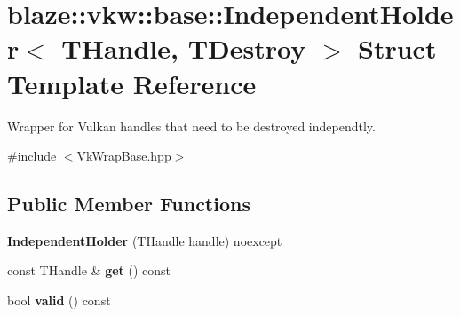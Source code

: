 \hypertarget{structblaze_1_1vkw_1_1base_1_1IndependentHolder}{}\section{blaze\+:\+:vkw\+:\+:base\+:\+:Independent\+Holder$<$ T\+Handle, T\+Destroy $>$ Struct Template Reference}
\label{structblaze_1_1vkw_1_1base_1_1IndependentHolder}


Wrapper for Vulkan handles that need to be destroyed independtly.  




{\ttfamily \#include $<$Vk\+Wrap\+Base.\+hpp$>$}

\subsection*{Public Member Functions}
\begin{DoxyCompactItemize}
\item 
\mbox{\label{structblaze_1_1vkw_1_1base_1_1IndependentHolder_a17b3ce30e1151cda2da9b6eb74a05223}} 
{\bfseries Independent\+Holder} (T\+Handle handle) noexcept
\item 
\mbox{\label{structblaze_1_1vkw_1_1base_1_1IndependentHolder_ab67a9f99f4077bfef5dda93b431fc3f5}} 
const T\+Handle \& {\bfseries get} () const
\item 
\mbox{\label{structblaze_1_1vkw_1_1base_1_1IndependentHolder_a4bdf2081ab32e8315b49eaa4e275c37e}} 
bool {\bfseries valid} () const
\end{DoxyCompactItemize}
